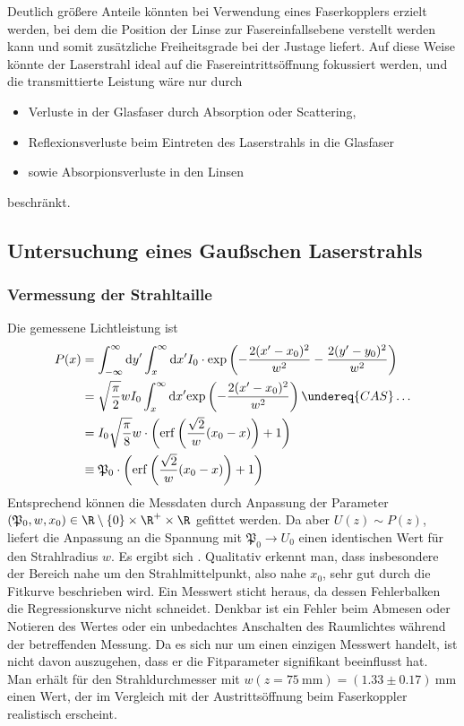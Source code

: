 \documentclass[11pt,a4paper,oneside]{scrartcl}
\begin{document}
Deutlich größere Anteile könnten bei Verwendung eines Faserkopplers erzielt werden, bei dem die Position der Linse zur Fasereinfallsebene verstellt werden kann und somit zusätzliche Freiheitsgrade bei der Justage liefert. Auf diese Weise könnte der Laserstrahl ideal auf die Fasereintrittsöffnung fokussiert werden, und die transmittierte Leistung wäre nur durch 
\begin{itemize}
\item Verluste in der Glasfaser durch Absorption oder Scattering,
\item Reflexionsverluste beim Eintreten des Laserstrahls in die Glasfaser
\item sowie Absorpionsverluste in den Linsen
\end{itemize}
beschränkt.
\subsection{Untersuchung eines Gaußschen Laserstrahls}
\subsubsection{Vermessung der Strahltaille}\label{Auswertung Vermessung der Strahltaille}
Die gemessene Lichtleistung ist 
\begin{align}
P(x)&=\int_{-\infty}^\infty \mathrm dy^\prime \int_x^\infty \mathrm dx^\prime I_0\cdot\mathrm{exp}\left(-\frac{2(x^\prime-x_0)^2}{w^2}-\frac{2(y^\prime-y_0)^2}{w^2}\right) \\ \quad& = \sqrt{\frac{\pi}{2}}wI_0\int_x^\infty \mathrm dx^\prime \mathrm{exp}\left(-\frac{2(x^\prime-x_0)^2}{w^2}\right) \undereq{CAS}\hdots \\ \quad& =I_0\sqrt{\frac{\pi}{8}}w\cdot\left(\mathrm{erf}\left(\frac{\sqrt{2}}{w}(x_0-x)\right)+1\right)\\ \quad& \equiv \mathfrak{P}_0\cdot\left(\mathrm{erf}\left(\frac{\sqrt{2}}{w}(x_0-x)\right)+1\right)
\end{align}
Entsprechend können die Messdaten durch Anpassung der Parameter $(\mathfrak P_0,w,x_0)\in \R\setminus\{0\}\times\R^+\times\R$ gefittet werden. Da aber $U(z)\sim P(z)$, liefert die Anpassung an die Spannung mit $\mathfrak P_0\rightarrow U_0$ einen identischen Wert für den Strahlradius $w$.
Es ergibt sich . Qualitativ erkennt man, dass insbesondere der Bereich nahe um den Strahlmittelpunkt, also nahe $x_0$, sehr gut durch die Fitkurve beschrieben wird. Ein Messwert sticht heraus, da dessen Fehlerbalken die Regressionskurve nicht schneidet. Denkbar ist ein Fehler beim Abmesen oder Notieren des Wertes oder ein unbedachtes Anschalten des Raumlichtes während der betreffenden Messung. Da es sich nur um einen einzigen Messwert handelt, ist nicht davon auszugehen, dass er die Fitparameter signifikant beeinflusst hat. \\
Man erhält für den Strahldurchmesser mit $w(z=75\ \mathrm{mm})=(1.33\pm0.17)\ \mathrm{mm}$ einen Wert, der im Vergleich mit der Austrittsöffnung beim Faserkoppler realistisch erscheint.
\end{document}
